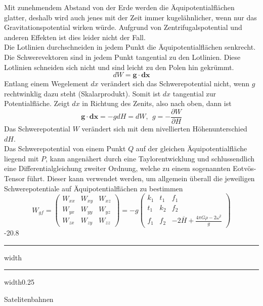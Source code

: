 \documentclass[9pt, landscape, fleqn]{scrartcl}
\makeatletter
\renewcommand{\section}{\@startsection{section}{1}{0mm}%
{-2\baselineskip}{0.8\baselineskip}%
{\hrule depth 0.2pt width\columnwidth\hrule depth1.5pt
width0.25\columnwidth\vspace*{1.2em}\Large\bfseries\rmfamily}}
\makeatother
\begin{document}
\begin{multicols*}{3}
Mit zunehmendem Abstand von der Erde werden die Äquipotentialflächen glatter, deshalb wird auch jenes mit der Zeit immer kugelähnlicher, wenn nur das Gravitationspotential wirken würde. Aufgrund von Zentrifugalspotential und anderen Effekten ist dies leider nicht der Fall. \\

Die Lotlinien durchschneiden in jedem Punkt die Äquipotentialflächen senkrecht. Die Schwerevektoren sind in jedem Punkt tangential zu den Lotlinien. Diese Lotlinien schneiden sich nicht und sind leicht zu den Polen hin gekrümmt.
\begin{equation*}
    dW = \mathbf{g} \cdot \mathbf{dx}
\end{equation*}
Entlang einem Wegelement $dx$ verändert sich das Schwerepotential nicht, wenn $g$ rechtwinklig dazu steht (Skalarprodukt). Somit ist $dx$ tangential zur Potentialfläche. Zeigt $dx$ in Richtung des Zenits, also nach oben, dann ist
\begin{equation*}
    \mathbf{g} \cdot \mathbf{dx} = -g dH = dW,~~ g = -\frac{\partial W}{\partial H}
\end{equation*}
Das Schwerepotential $W$ verändert sich mit dem nivellierten Höhenunterschied $dH$. \\

Das Schwerepotential von einem Punkt $Q$ auf der gleichen Äquipotentialfläche liegend mit $P$, kann angenähert durch eine Taylorentwicklung und schlussendlich eine Differentialgleichung zweiter Ordnung, welche zu einem sogenannten Eotvös-Tensor führt. Dieser kann verwendet werden, um allgemein überall die jeweiligen Schwerepotentiale auf Äquipotentialflächen zu bestimmen
\begin{equation*}
    W_{gf} = \begin{pmatrix}
        W_{xx} & W_{xy} & W_{xz} \\
        W_{yx} & W_{yy} & W_{yz} \\
        W_{zx} & W_{zy} & W_{zz}
    \end{pmatrix} = - g \begin{pmatrix}
        k_1 & t_1 & f_1 \\
        t_1 & k_2 & f_2 \\
        f_1 & f_2 & -2 \overline{H} + \frac{4 \pi G \rho - 2 \omega^2}{g}
    \end{pmatrix}
\end{equation*}
\section{Satelitenbahnen}

\end{multicols*}
\end{document}
